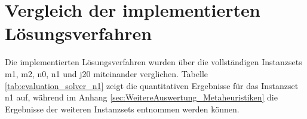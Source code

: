 \section{Vergleich der implementierten Lösungsverfahren} \label{sec:BenchmarkErgebnisse_MetaheuristischeVerfahren}

Die implementierten Lösungsverfahren wurden über die vollständigen Instanzsets m1, m2, n0, n1 und j20 miteinander verglichen. Tabelle \ref{tab:evaluation_solver_n1} zeigt die quantitativen Ergebnisse für das Instanzset n1 auf, während im Anhang \ref{sec:WeitereAuswertung_Metaheuristiken} die Ergebnisse der weiteren Instanzsets entnommen werden können. 

